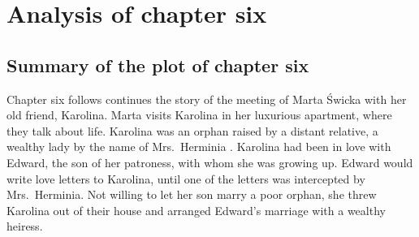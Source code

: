 \section{Analysis of chapter six}

\subsection{Summary of the plot of chapter six}

Chapter six follows continues the story of the meeting of Marta Świcka with her old friend, Karolina.
Marta visits Karolina in her luxurious apartment, where they talk about life.
Karolina was an orphan raised by a distant relative, a wealthy lady by the name of Mrs.\ Herminia%
.
Karolina had been in love with Edward, the son of her patroness, with whom she was growing up.
Edward would write love letters to Karolina, until one of the letters was intercepted by Mrs.\ Herminia.
Not willing to let her son marry a poor orphan, she threw Karolina out of their house and arranged Edward's marriage with a wealthy heiress.
